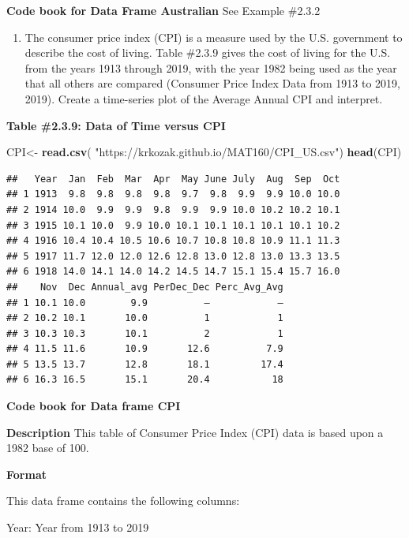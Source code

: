 \documentclass[
]{book}
\newenvironment{Shaded}{\begin{snugshade}}{\end{snugshade}}
\newcommand{\KeywordTok}[1]{\textcolor[rgb]{0.13,0.29,0.53}{\textbf{#1}}}
\newcommand{\NormalTok}[1]{#1}
\newcommand{\StringTok}[1]{\textcolor[rgb]{0.31,0.60,0.02}{#1}}
\providecommand{\tightlist}{%
  \setlength{\itemsep}{0pt}\setlength{\parskip}{0pt}}
\begin{document}
\textbf{Code book for Data Frame Australian} See Example \#2.3.2

\begin{enumerate}
\def\labelenumi{\arabic{enumi}.}
\setcounter{enumi}{6}
\tightlist
\item
  The consumer price index (CPI) is a measure used by the U.S. government to describe the cost of living. Table \#2.3.9 gives the cost of living for the U.S. from the years 1913 through 2019, with the year 1982 being used as the year that all others are compared (Consumer Price Index Data from 1913 to 2019, 2019). Create a time-series plot of the Average Annual CPI and interpret.
\end{enumerate}

\textbf{Table \#2.3.9: Data of Time versus CPI}

\begin{Shaded}
\begin{Highlighting}[]
\NormalTok{CPI<-}\StringTok{ }\KeywordTok{read.csv}\NormalTok{(}
  \StringTok{"https://krkozak.github.io/MAT160/CPI_US.csv"}\NormalTok{)}
\KeywordTok{head}\NormalTok{(CPI)}
\end{Highlighting}
\end{Shaded}

\begin{verbatim}
##   Year  Jan  Feb  Mar  Apr  May June July  Aug  Sep  Oct
## 1 1913  9.8  9.8  9.8  9.8  9.7  9.8  9.9  9.9 10.0 10.0
## 2 1914 10.0  9.9  9.9  9.8  9.9  9.9 10.0 10.2 10.2 10.1
## 3 1915 10.1 10.0  9.9 10.0 10.1 10.1 10.1 10.1 10.1 10.2
## 4 1916 10.4 10.4 10.5 10.6 10.7 10.8 10.8 10.9 11.1 11.3
## 5 1917 11.7 12.0 12.0 12.6 12.8 13.0 12.8 13.0 13.3 13.5
## 6 1918 14.0 14.1 14.0 14.2 14.5 14.7 15.1 15.4 15.7 16.0
##    Nov  Dec Annual_avg PerDec_Dec Perc_Avg_Avg
## 1 10.1 10.0        9.9          –            –
## 2 10.2 10.1       10.0          1            1
## 3 10.3 10.3       10.1          2            1
## 4 11.5 11.6       10.9       12.6          7.9
## 5 13.5 13.7       12.8       18.1         17.4
## 6 16.3 16.5       15.1       20.4           18
\end{verbatim}

\textbf{Code book for Data frame CPI}

\textbf{Description}
This table of Consumer Price Index (CPI) data is based upon a 1982 base of 100.

\textbf{Format}

This data frame contains the following columns:

Year: Year from 1913 to 2019
\end{document}
